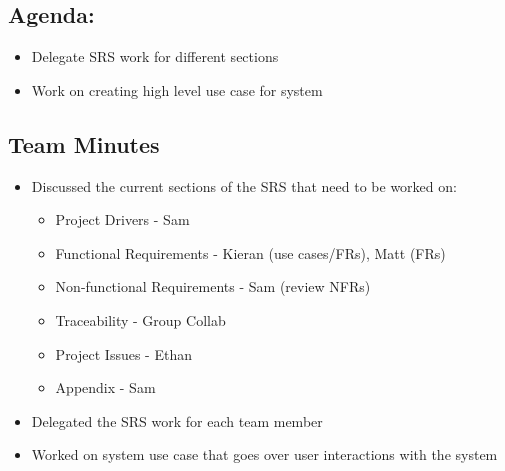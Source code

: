 \documentclass{article}
\begin{document}
\subsection*{Agenda:}
\begin{itemize}
    \item Delegate SRS work for different sections
    \item Work on creating high level use case for system
\end{itemize}

\subsection*{Team Minutes}

\begin{itemize}
    \item Discussed the current sections of the SRS that need to be worked on:
    \begin{itemize}
        \item Project Drivers - Sam
        \item Functional Requirements - Kieran (use cases/FRs), Matt (FRs)
        \item Non-functional Requirements - Sam (review NFRs)
        \item Traceability - Group Collab
        \item Project Issues - Ethan
        \item Appendix - Sam
    \end{itemize}
    \item Delegated the SRS work for each team member
    \item Worked on system use case that goes over user interactions with the system
\end{itemize}
\end{document}
